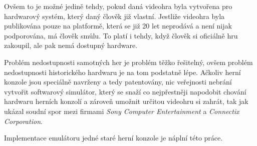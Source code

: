 Ovšem to je možné jedině tehdy, pokud daná videohra byla vytvořena pro hardwarový systém,
který daný člověk již vlastní. Jestliže videohra byla publikována pouze na platformě,
která se již 20 let neprodává a není nijak podporována, má člověk smůlu.
To platí i tehdy, když člověk si oficiálně hru zakoupil, ale pak nemá dostupný hardware.

Problém nedostupnosti samotných her je problém těžko řešitelný, ovšem problém nedostupnosti
historického hardwaru je na tom podstatně lépe. Ačkoliv herní konzole jsou
speciálně navrženy a tedy patentovány, nic veřejnosti nebrání vytvořit softwarový simulátor,
který se snaží co nejpřestněji napodobit chování hardwaru herních konzolí a 
zároveň umožnit určitou videohru si zahrát, tak jak ukázal soudní spor mezi 
firmami \textit{Sony Computer Entertainment} a \textit{Connectix Corporation}.

Implementace emulátoru jedné staré herní konzole je náplní této práce.
